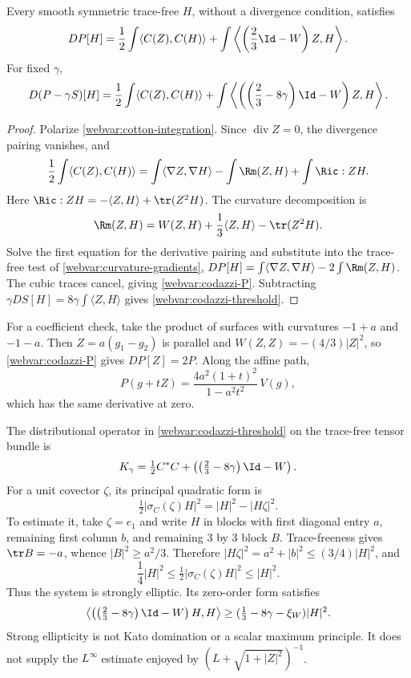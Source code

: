\begin{proposition}
\label{webvar:codazzi-first-variation}
Every smooth symmetric trace-free $H$, without a divergence condition,
satisfies
\begin{equation}\label{webvar:codazzi-P}
 DP[H]=\frac12\int\langle C(Z),C(H)\rangle
             +\int\left\langle\left(\frac23\Id-W\right)Z,H\right\rangle.
\end{equation}
For fixed $\gamma$,
\begin{equation}\label{webvar:codazzi-threshold}
 D(P-\gamma S)[H]=\frac12\int\langle C(Z),C(H)\rangle
       +\int\left\langle
              \left(\left(\frac23-8\gamma\right)\Id-W\right)Z,H\right\rangle.
\end{equation}
\end{proposition}
\begin{proof}
Polarize \eqref{webvar:cotton-integration}.  Since
$\operatorname{div}Z=0$, the divergence pairing vanishes, and
\[
 \frac12\int\langle C(Z),C(H)\rangle
 =\int\langle\nabla Z,\nabla H\rangle
             -\int\Rm(Z,H)+\int\Ric:ZH.
\]
Here $\Ric:ZH=-\langle Z,H\rangle+\tr(Z^2H)$.
The curvature decomposition is
\[
 \Rm(Z,H)=W(Z,H)+\frac13\langle Z,H\rangle-\tr(Z^2H).
\]
Solve the first equation for the derivative pairing and substitute
into the trace-free test of \eqref{webvar:curvature-gradients},
$DP[H]=\int\langle\nabla Z,\nabla H\rangle-2\int\Rm(Z,H)$.
The cubic traces cancel, giving \eqref{webvar:codazzi-P}.
Subtracting $\gamma DS[H]=8\gamma\int\langle Z,H\rangle$
gives \eqref{webvar:codazzi-threshold}.
\end{proof}

For a coefficient check, take the product of surfaces with curvatures
$-1+a$ and $-1-a$.  Then $Z=a(g_1-g_2)$ is parallel and
$W(Z,Z)=-(4/3)|Z|^2$, so \eqref{webvar:codazzi-P} gives $DP[Z]=2P$.
Along the affine path,
\[
 P(g+tZ)=\frac{4a^2(1+t)^2}{1-a^2t^2}\,V(g),
\]
which has the same derivative at zero.

The distributional operator in \eqref{webvar:codazzi-threshold}
on the trace-free tensor bundle is
\[
 K_\gamma=\tfrac12C^*C+
          \left(\left(\tfrac23-8\gamma\right)\Id-W\right).
\]
For a unit covector $\zeta$, its principal quadratic form is
\[
 \tfrac12|\sigma_C(\zeta)H|^2=|H|^2-|H\zeta|^2.
\]
To estimate it, take $\zeta=e_1$ and write $H$ in blocks with
first diagonal entry $a$, remaining first column $b$, and remaining
$3$ by $3$ block $B$.  Trace-freeness gives $\tr B=-a$, whence
$|B|^2\ge a^2/3$.  Therefore
$|H\zeta|^2=a^2+|b|^2\le(3/4)|H|^2$, and
\begin{equation}\label{webvar:codazzi-symbol}
 \frac14|H|^2\le\tfrac12|\sigma_C(\zeta)H|^2\le|H|^2.
\end{equation}
Thus the system is strongly elliptic.  Its zero-order form satisfies
\begin{equation}\label{webvar:codazzi-potential}
 \left\langle
    \left(\left(\tfrac23-8\gamma\right)\Id-W\right)H,H\right\rangle
 \ge(\tfrac13-8\gamma-\xi_W)|H|^2.
\end{equation}
Strong ellipticity is not Kato domination or a scalar maximum principle.
It does not supply the $L^\infty$ estimate enjoyed by
$(L+\sqrt{1+|Z|^2})^{-1}$.


